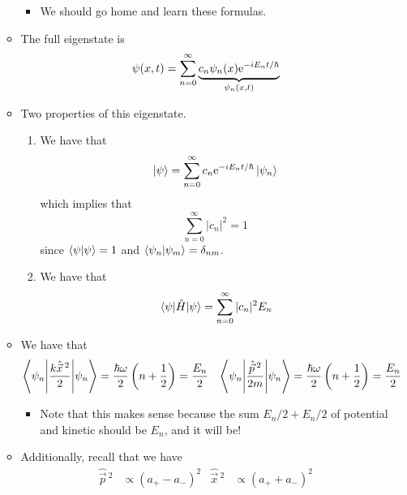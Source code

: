 \documentclass[../notes.tex]{subfiles}
\begin{document}
\begin{itemize}
\begin{itemize}
\begin{itemize}
            \item We should go home and learn these formulas.
        \end{itemize}
        \item The full eigenstate is
        \begin{equation*}
            \psi(x,t) = \sum_{n=0}^\infty\underbrace{c_n\psi_n(x)\e[-iE_nt/\hbar]}_{\psi_n(x,t)}
        \end{equation*}
        \item Two properties of this eigenstate.
        \begin{enumerate}
            \item We have that
            \begin{equation*}
                \ket{\psi} = \sum_{n=0}^\infty c_n\e[-iE_nt/\hbar]\ket{\psi_n}
            \end{equation*}
            which implies that
            \begin{equation*}
                \sum_{n=0}^\infty|c_n|^2 = 1
            \end{equation*}
            since $\braket{\psi}=1$ and $\braket{\psi_n}{\psi_m}=\delta_{nm}$.
            \item We have that
            \begin{equation*}
                \ev{\hat{H}}{\psi} = \sum_{n=0}^\infty|c_n|^2E_n
            \end{equation*}
        \end{enumerate}
        \item We have that
        \begin{align*}
            \ev**{\frac{k\hat{\vec{x}}{\,}^2}{2}}{\psi_n} &= \frac{\hbar\omega}{2}\left( n+\frac{1}{2} \right) = \frac{E_n}{2}&
            \ev**{\frac{\hat{\vec{p}}{\,}^2}{2m}}{\psi_n} &= \frac{\hbar\omega}{2}\left( n+\frac{1}{2} \right) = \frac{E_n}{2}
        \end{align*}
        \begin{itemize}
            \item Note that this makes sense because the sum $E_n/2+E_n/2$ of potential and kinetic should be $E_n$, and it will be!
        \end{itemize}
        \item Additionally, recall that we have
        \begin{align*}
            \hat{\vec{p}}{\,}^2 &\propto (a_+-a_-)^2&
            \hat{\vec{x}}{\,}^2 &\propto (a_++a_-)^2
        \end{align*}

\end{itemize}
\end{itemize}
\end{document}
